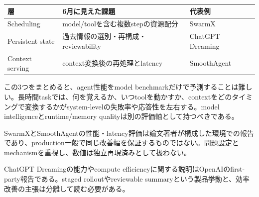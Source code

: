 \begin{center}
\small
\begin{tabularx}{\columnwidth}{>{\raggedright\arraybackslash}X|>{\raggedright\arraybackslash}X|>{\raggedright\arraybackslash}X}
\toprule
\textbf{層} & \textbf{6月に見えた課題} & \textbf{代表例} \\
\midrule
Scheduling & model/toolを含む複数stepの資源配分 & SwarmX \\
Persistent state & 過去情報の選別・再構成・reviewability & ChatGPT Dreaming \\
Context serving & context変換後の再処理とlatency & SmoothAgent \\
\bottomrule
\end{tabularx}
\autocite{src-80f8b4d899ff,src-c3ab33c62226,src-e8d9fd84bddc}
\end{center}

この3つをまとめると、agent性能をmodel benchmarkだけで予測することは難しい。長時間taskでは、何を覚えるか、いつtoolを動かすか、contextをどのタイミングで変換するかがsystem-levelの失敗率や応答性を左右する。model intelligenceとruntime/memory qualityは別の評価軸として持つべきである。\autocite{src-80f8b4d899ff,src-c3ab33c62226,src-e8d9fd84bddc}


\begin{claimboundary}
SwarmXとSmoothAgentの性能・latency評価は論文著者が構成した環境での報告であり、production一般で同じ改善幅を保証するものではない。問題設定とmechanismを重視し、数値は独立再現済みとして扱わない。\autocite{src-80f8b4d899ff,src-e8d9fd84bddc}
\end{claimboundary}

\begin{claimboundary}
ChatGPT Dreamingの能力やcompute efficiencyに関する説明はOpenAIのfirst-party報告である。staged rolloutやreviewable summaryという製品挙動と、効率改善の主張は分離して読む必要がある。\autocite{src-c3ab33c62226}
\end{claimboundary}
